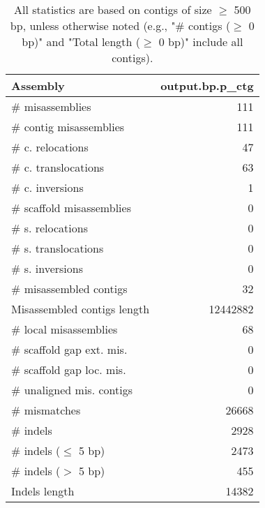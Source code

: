\documentclass[12pt,a4paper]{article}
\begin{document}
\begin{table}[ht]
\begin{center}
\caption{All statistics are based on contigs of size $\geq$ 500 bp, unless otherwise noted (e.g., "\# contigs ($\geq$ 0 bp)" and "Total length ($\geq$ 0 bp)" include all contigs).}
\begin{tabular}{|l*{1}{|r}|}
\hline
Assembly & output.bp.p\_ctg \\ \hline
\# misassemblies & 111 \\ \hline
\hspace{2mm}\# contig misassemblies & 111 \\ \hline
\hspace{5mm}\# c. relocations & 47 \\ \hline
\hspace{5mm}\# c. translocations & 63 \\ \hline
\hspace{5mm}\# c. inversions & 1 \\ \hline
\hspace{2mm}\# scaffold misassemblies & 0 \\ \hline
\hspace{5mm}\# s. relocations & 0 \\ \hline
\hspace{5mm}\# s. translocations & 0 \\ \hline
\hspace{5mm}\# s. inversions & 0 \\ \hline
\# misassembled contigs & 32 \\ \hline
Misassembled contigs length & 12442882 \\ \hline
\# local misassemblies & 68 \\ \hline
\# scaffold gap ext. mis. & 0 \\ \hline
\# scaffold gap loc. mis. & 0 \\ \hline
\# unaligned mis. contigs & 0 \\ \hline
\# mismatches & 26668 \\ \hline
\# indels & 2928 \\ \hline
\hspace{5mm}\# indels ($\leq$ 5 bp) & 2473 \\ \hline
\hspace{5mm}\# indels ($>$ 5 bp) & 455 \\ \hline
Indels length & 14382 \\ \hline
\end{tabular}
\end{center}
\end{table}
\end{document}
